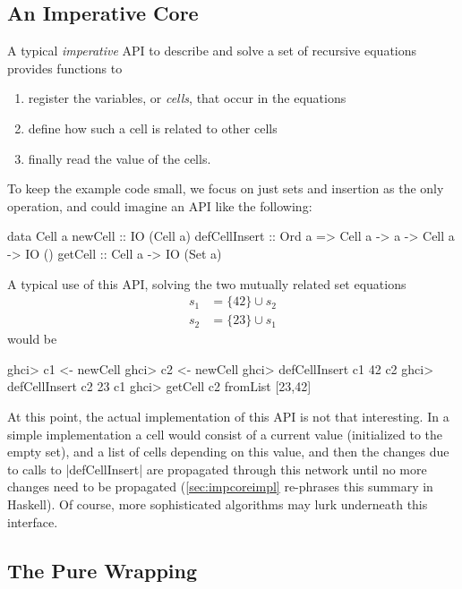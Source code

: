 \documentclass[manuscript,screen,acmsmall,nonacm]{acmart}
\begin{document}
\subsection{An Imperative Core}\label{sec:impcore}

A typical \emph{imperative} API to describe and solve a set of recursive equations provides functions to
\begin{enumerate}
\item register the variables, or \emph{cells}, that occur in the equations
\item define how such a cell is related to other cells
\item finally read the value of the cells.
\end{enumerate}
To keep the example code small, we focus on just sets and insertion as the only operation, and could imagine an API like the following:

\begin{minipage}{\linewidth}
\begin{code}
data Cell a
newCell        ::                                      IO (Cell a)
defCellInsert  ::  Ord a =>  Cell a -> a -> Cell a ->  IO ()
getCell        ::            Cell a ->                 IO (Set a)
\end{code}
\end{minipage}

A typical use of this API, solving the two mutually related set equations
\begin{align*}
s_1 &= \{ 42 \} \cup s_2 \\
s_2 &= \{ 23 \} \cup s_1
\end{align*}
would be
\begin{code}
ghci> c1 <- newCell
ghci> c2 <- newCell
ghci> defCellInsert c1 42 c2
ghci> defCellInsert c2 23 c1
ghci> getCell c2
fromList [23,42]
\end{code}

At this point, the actual implementation of this API is not that interesting. In a simple implementation a cell would consist of a current value (initialized to the empty set), and a list of cells depending on this value, and then the changes due to calls to |defCellInsert| are propagated through this network until no more changes need to be propagated (\cref{sec:impcoreimpl} re-phrases this summary in Haskell). Of course, more sophisticated algorithms may lurk underneath this interface.

\subsection{The Pure Wrapping}
\end{document}
